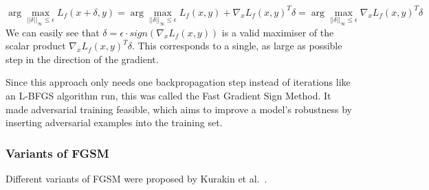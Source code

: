 \documentclass[review]{AIM_report}
\begin{document}
\[
\arg\max_{\lvert\lvert\delta\rvert\rvert_\infty\leq\epsilon}L_f(x+\delta, y) = 
\arg\max_{\lvert\lvert\delta\rvert\rvert_\infty\leq\epsilon}L_f(x, y) + \nabla_x L_f(x, y)^T \delta =
\arg\max_{\lvert\lvert\delta\rvert\rvert_\infty\leq\epsilon}\nabla_x L_f(x, y)^T \delta
\]
We can easily see that $\delta = \epsilon \cdot sign(\nabla_x L_f(x, y))$ is a valid maximiser of the scalar product  $\nabla_x L_f(x, y)^T \delta$. This corresponds to a single, as large as possible step in the direction of the gradient.





Since this approach only needs one backpropagation step instead of iterations like an L-BFGS algorithm run, this was called the Fast Gradient Sign Method. It made adversarial training feasible, which aims to improve a model's robustness by inserting adversarial examples into the training set.

\subsubsection{Variants of FGSM}

Different variants of FGSM were proposed by Kurakin et al.~\cite{kurakin2016adversarial, kurakin2017physical}.
\end{document}
